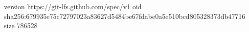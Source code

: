 version https://git-lfs.github.com/spec/v1
oid sha256:679935e75c72797023a83627d5484be67fdabe0a5e510bcd805328373db47716
size 786528
